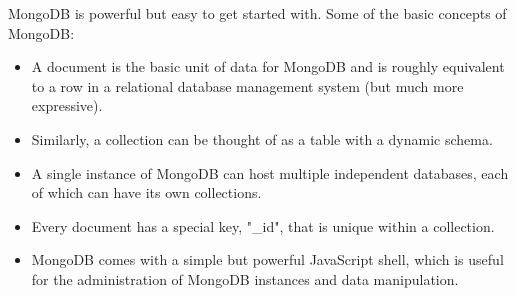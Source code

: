 MongoDB is powerful but easy to get started with. Some 
of the basic concepts of MongoDB:
\begin{itemize}
    \item A document is the basic unit of data for MongoDB and is roughly equivalent to a
    row in a relational database management system (but much more expressive).
    \item Similarly, a collection can be thought of as a table with a dynamic schema.
    \item A single instance of MongoDB can host multiple independent databases, each of
    which can have its own collections.
    \item Every document has a special key, "\_id", that is unique within a collection.
    \item MongoDB comes with a simple but powerful JavaScript shell, which is useful for
    the administration of MongoDB instances and data manipulation.
\end{itemize}
